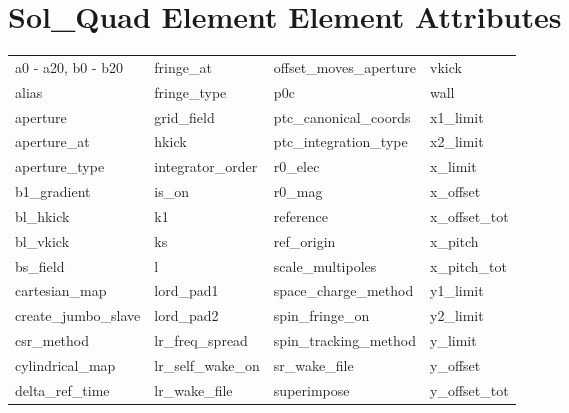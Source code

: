  \vfill
 
 \section{Sol_Quad Element Element Attributes}
 \label{s:list.sol.quad}
 
 \begin{tabular}{llll} \toprule
a0 - a20, b0 - b20          & fringe_at                   & offset_moves_aperture       & vkick                       \\
alias                       & fringe_type                 & p0c                         & wall                        \\
aperture                    & grid_field                  & ptc_canonical_coords        & x1_limit                    \\
aperture_at                 & hkick                       & ptc_integration_type        & x2_limit                    \\
aperture_type               & integrator_order            & r0_elec                     & x_limit                     \\
b1_gradient                 & is_on                       & r0_mag                      & x_offset                    \\
bl_hkick                    & k1                          & reference                   & x_offset_tot                \\
bl_vkick                    & ks                          & ref_origin                  & x_pitch                     \\
bs_field                    & l                           & scale_multipoles            & x_pitch_tot                 \\
cartesian_map               & lord_pad1                   & space_charge_method         & y1_limit                    \\
create_jumbo_slave          & lord_pad2                   & spin_fringe_on              & y2_limit                    \\
csr_method                  & lr_freq_spread              & spin_tracking_method        & y_limit                     \\
cylindrical_map             & lr_self_wake_on             & sr_wake_file                & y_offset                    \\
delta_ref_time              & lr_wake_file                & superimpose                 & y_offset_tot                \\

\end{tabular}
